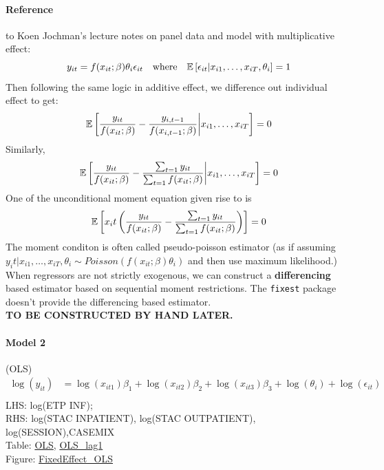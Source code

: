 \paragraph{Reference} to Koen Jochman's lecture notes on panel data and model with multiplicative
effect:
\begin{equation*}
    y_{it}=f(x_{it};\beta)\theta_i\epsilon_{it} \quad \text{where} \quad \mathbb{E}\left[\epsilon_{it}|x_{i1},\ldots,x_{iT},\theta_i\right]=1
\end{equation*}
Then following the same logic in additive effect, we difference out individual effect to get:
\begin{equation*}
    \mathbb{E}\left[\frac{y_{it}}{f(x_{it};\beta)}-\frac{y_{i,t-1}}{f(x_{i,t-1};\beta)}\bigg | x_{i1},\ldots,x_{iT}\right]=0
\end{equation*}
Similarly, \begin{equation*}
    \mathbb{E}\left[\frac{y_{it}}{f(x_{it};\beta)}-\frac{\sum_{t=1}y_{it}}{\sum_{t=1}f(x_{it};\beta)}\bigg | x_{i1},\ldots,x_{iT}\right]=0
\end{equation*}
One of the unconditional moment equation given rise to is \begin{equation}
    \mathbb{E}\left[x_it\left(\frac{y_{it}}{f(x_{it};\beta)}-\frac{\sum_{t=1}y_{it}}{\sum_{t=1}f(x_{it};\beta)}\right)\right]=0
\end{equation}
The moment conditon is often called pseudo-poisson estimator (as if assuming $y_it|x_{i1},\ldots,x_{iT},\theta_i\sim Poisson(f(x_{it};\beta)\theta_i)$ and then use maximum likelihood.)
When regressors are not strictly exogenous, we can construct a \textbf{differencing} based estimator based on sequential moment restrictions.
The \verb+fixest+ package doesn't provide the differencing based estimator. \\
\textbf{TO BE CONSTRUCTED BY HAND LATER.}
\paragraph{Model 2} (OLS)
\begin{align*}
    \log(y_{it}) & =\log(x_{it1})\beta_1+\log(x_{it2})\beta_2+\log(x_{it3})\beta_3+\log(\theta_i)+\log(\epsilon_{it}) \\
\end{align*}
LHS: log(ETP INF); \\ RHS: log(STAC INPATIENT), log(STAC OUTPATIENT),
log(SESSION),CASEMIX
\\Table: \hyperlink{reg_inf_ols_2022}{OLS},
\hyperlink{reg_inf_lag_2022}{OLS\_lag1}
\\Figure: \hyperlink{FE_OLS_FI}{FixedEffect\_OLS}

